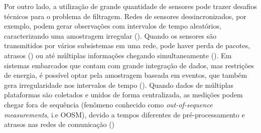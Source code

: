 Por outro lado, a utilização de grande quantidade de sensores pode trazer desafios técnicos para o problema de filtragem. Redes de sensores dessincronizados, por exemplo, podem gerar observações com intervalos de tempo aleatórios, caracterizando uma amostragem irregular (). Quando os sensores são transmitidos por vários subsistemas em uma rede, pode haver perda de pacotes, atrasos () ou até múltiplas informações chegando simultaneamente (). Em sistemas embarcados que contam com grande integração de dados, mas restrições de energia, é possível optar pela amostragem baseada em eventos, que também gera irregularidade nos intervalos de tempo (). Quando dados de múltiplas plataformas são coletados e unidos de forma centralizada, as medições podem chegar fora de sequência (fenômeno conhecido como \textit{out-of-sequence measurements}, i.e OOSM), devido a tempos diferentes de pré-processamento e atrasos nas redes de comunicação ()

